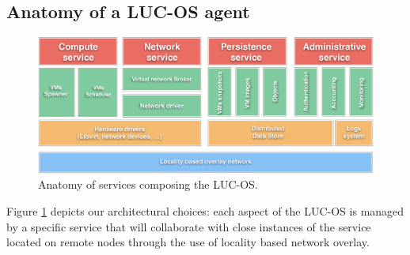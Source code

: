 \subsection{Anatomy of a LUC-OS agent}



\begin{figure}
	\centerline{
	 \includegraphics[width=1.25\linewidth]{Figures/luc_os_anatomy.pdf}
  }
	\caption{Anatomy of services composing the LUC-OS.}%
	\label{fig:anatomy}%
\end{figure}

Figure \ref{fig:anatomy} depicts our architectural choices: each aspect of the 
LUC-OS is managed by a specific service that will collaborate with close 
instances of the service located on remote nodes through the use of locality
based network overlay. 

